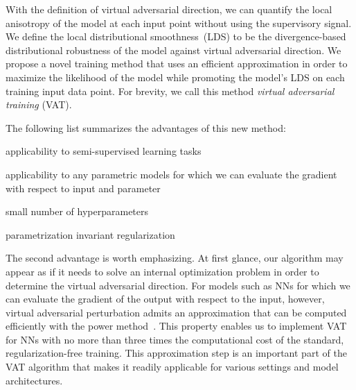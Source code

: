 \documentclass[10pt,journal,compsoc]{IEEEtran}
\newcommand\kwrite[1]{\textcolor{blue}{Koyama: #1}}
\newcommand\iwrite[1]{\textcolor{red}{Meada: #1}}
\newcommand\new[1]{\textcolor{blue}{#1}}
\newenvironment{tight_itemize}{
\begin{itemize}
  \setlength{\itemsep}{0pt}
  \setlength{\parskip}{0pt}
  \setlength{\topsep}{0pt}
  \setlength{\partopsep}{0pt}
}{\end{itemize}}
\begin{document}
With the definition of virtual adversarial direction, we can quantify the local anisotropy of the model at each input point without using the supervisory signal. 
We define the local distributional smoothness~(LDS) to be the divergence-based distributional robustness of the model against virtual adversarial direction.
We propose a novel training method that uses an efficient approximation in order to maximize the likelihood of the model while promoting the model's LDS on each training input data point. 
For brevity, we call this method \textit{virtual adversarial training} (VAT). %

The following list summarizes the advantages of this new method: 
\begin{tight_itemize}
\item applicability to semi-supervised learning tasks
\item applicability to any parametric models for which we can evaluate the gradient with respect to input and parameter
\item small number of hyperparameters
\item parametrization invariant regularization
\end{tight_itemize}
The second advantage is worth emphasizing.
At first glance, our algorithm may appear as if it needs to solve an internal optimization problem in order to determine the virtual adversarial direction. 
For models such as NNs for which we can evaluate the gradient of the output with respect to the input, however, virtual adversarial perturbation admits an approximation that can be computed efficiently with the power method~\cite{golub2000eigenvalue}. 
This property enables us to implement VAT for NNs with no more than three times the computational cost of the standard, regularization-free training. 
This approximation step is an important part of the VAT algorithm that makes it readily applicable for various settings and model architectures.
\end{document}
